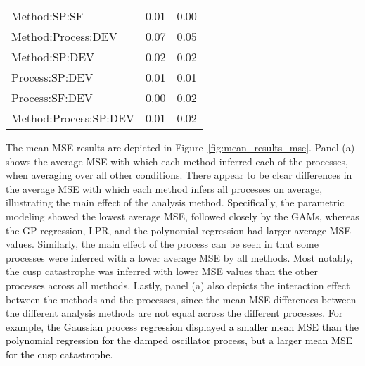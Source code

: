 \documentclass[man, floatsintext]{apa7}
\begin{document}
\begin{table}[tbp]
\begin{center}
\begin{threeparttable}
\begin{tabular}{lll}
        \\
        Method:SP:SF          & 0.01                                     & 0.00
        \\
        Method:Process:DEV    & 0.07                                     & 0.05
        \\
        Method:SP:DEV         & 0.02                                     & 0.02
        \\
        Process:SP:DEV        & 0.01                                     & 0.01
        \\
        Process:SF:DEV        & 0.00                                     & 0.02
        \\
        Method:Process:SP:DEV & 0.01                                     & 0.02
        \\
        \bottomrule
      \end{tabular}
    \end{threeparttable}
  \end{center}
\end{table}

The mean MSE results are depicted in Figure~\ref{fig:mean_results_mse}. Panel
(a) shows the average MSE with which each method inferred each of the
processes, when averaging over all other conditions. There appear to be clear
differences in the average MSE with which each method infers all processes on
average, illustrating the main effect of the analysis method. Specifically, the
parametric modeling showed the lowest average MSE, followed closely by the
GAMs, whereas the GP regression, LPR, and the polynomial regression had larger
average MSE values. Similarly, the main effect of the process can be seen in
that some processes were inferred with a lower average MSE by all methods. Most
notably, the cusp catastrophe was inferred with lower MSE values than the other
processes across all methods. Lastly, panel (a) also depicts the interaction
effect between the methods and the processes, since the mean MSE differences
between the different analysis methods are not equal across the different
processes. For example, \textcolor{black}{the Gaussian process regression
  displayed a smaller mean MSE than the polynomial regression for the damped
  oscillator process, but a larger mean MSE for the cusp catastrophe.}
\end{document}
